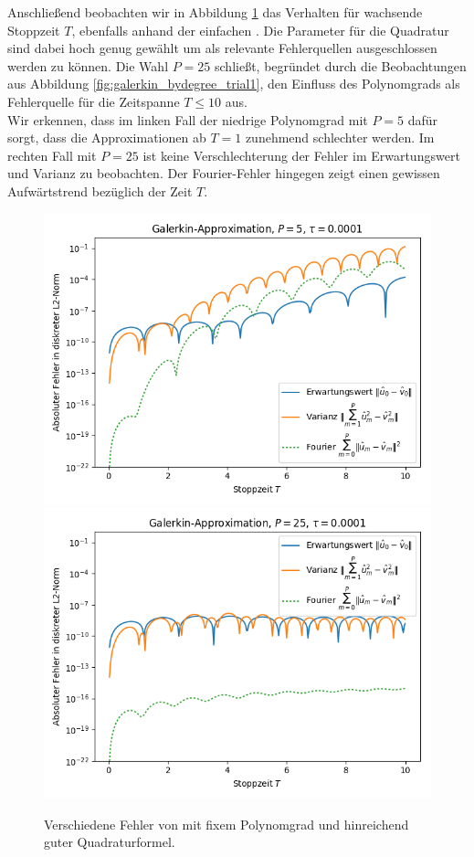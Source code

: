 \newline
Anschließend beobachten wir in Abbildung \ref{fig:galerkin_bystoptime_trial1} das Verhalten für wachsende Stoppzeit $T$, ebenfalls anhand der einfachen . Die Parameter für die Quadratur sind dabei hoch genug gewählt um als relevante Fehlerquellen ausgeschlossen werden zu können. Die Wahl $P=25$ schließt, begründet durch die Beobachtungen aus Abbildung \ref{fig:galerkin_bydegree_trial1}, den Einfluss des Polynomgrads als Fehlerquelle für die Zeitspanne $T\le 10$ aus.\\
Wir erkennen, dass im linken Fall der niedrige Polynomgrad mit $P=5$ dafür sorgt, dass die Approximationen ab $T=1$ zunehmend schlechter werden. Im rechten Fall mit $P=25$ ist keine Verschlechterung der Fehler im Erwartungswert und Varianz zu beobachten. Der Fourier-Fehler hingegen zeigt einen gewissen Aufwärtstrend bezüglich der Zeit $T$.
\begin{figure}[!htb]
  \includegraphics[width=\linewidth]{Figures/galerkin_bystoptime_trial1_fixeddegree5.png}
\endminipage
{}
  \includegraphics[width=\linewidth]{Figures/galerkin_bystoptime_trial1_fixeddegree25.png}
\endminipage
  \caption{Verschiedene Fehler von  mit fixem Polynomgrad und hinreichend guter Quadraturformel.}
  \label{fig:galerkin_bystoptime_trial1}
\end{figure}
